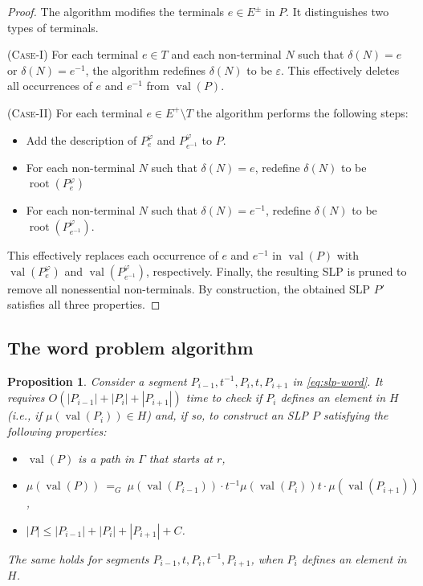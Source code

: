 \documentclass[12pt,oneside]{amsart}
\newtheorem{proposition}[theorem]{Proposition}
\theoremstyle{definition}
\theoremstyle{case}
\DeclareMathOperator{\val}{val}
\DeclareMathOperator{\rootSLP}{root}
\begin{document}
\begin{proof}
The algorithm modifies the terminals $e\in E^\pm$ in $P$.
It distinguishes two types of terminals.

\textsc{(Case-I)}
For each terminal $e \in T$ and each non-terminal $N$ such that
$\delta(N) = e$ or $\delta(N) = e^{-1}$, the algorithm redefines
$\delta(N)$ to be $\varepsilon$.
This effectively deletes all occurrences of $e$ and $e^{-1}$
from $\val(P)$.

\textsc{(Case-II)}  
For each terminal $e\in E^+\setminus T$ the algorithm performs 
the following steps:
\begin{itemize}
\item 
Add the description of $P_e^{\varphi}$ and $P_{e^{-1}}^{\varphi}$ 
to $P$.
\item 
For each non-terminal $N$ such that $\delta(N)=e$,
redefine $\delta(N)$ to be $\rootSLP(P_e^{\varphi})$
\item 
For each non-terminal $N$ such that $\delta(N)=e^{-1}$,
redefine $\delta(N)$ to be $\rootSLP(P_{e^{-1}}^{\varphi})$.
\end{itemize}
This effectively replaces each occurrence of $e$ and $e^{-1}$
in $\val(P)$ with $\val(P_{e}^\varphi)$ 
and $\val(P_{e^{-1}}^\varphi)$, respectively.
Finally, the resulting SLP is pruned to remove all nonessential 
non-terminals.
By construction, the obtained SLP $P'$ satisfies all three properties.
\end{proof}

\subsection{The word problem algorithm}
\label{se:WP-normal-fi}

\begin{proposition}\label{pr:main-step-case-I}
Consider a segment $P_{i-1},t^{-1},P_i,t,P_{i+1}$ in \eqref{eq:slp-word}.
It requires $O(|P_{i-1}|+|P_{i}|+|P_{i+1}|)$ time to check if
$P_i$ defines an element in $H$ 
(i.e., if $\mu(\val(P_i)) \in H$)
and, if so, to construct
an SLP $P$ satisfying the following properties:
\begin{itemize}
\item[(a)]
$\val(P)$ is a path in $\Gamma$ that starts at $r$,
\item[(b)]
$\mu(\val(P))\ =_G\ 
\mu(\val(P_{i-1})) 
\cdot
t^{-1} \mu(\val(P_{i})) t
\cdot
\mu(\val(P_{i+1}))$,
\item[(c)]
$|P| \le |P_{i-1}| + |P_i| + |P_{i+1}| + C$.
\end{itemize}
The same holds for segments $P_{i-1},t,P_i,t^{-1},P_{i+1}$, when
$P_i$ defines an element in $H$.
\end{proposition}
\end{document}
